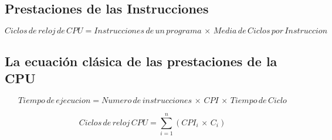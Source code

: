 \documentclass[12pt]{article}
\begin{document}
\subsection*{Prestaciones de las Instrucciones}

\begin{equation}
    Ciclos\hspace{2pt}de\hspace{2pt}reloj\hspace{2pt}de\hspace{2pt}CPU = Instrucciones\hspace{2pt}de\hspace{2pt}un\hspace{2pt}programa\hspace{2pt}\times\hspace{2pt}Media\hspace{2pt}de\hspace{2pt}Ciclos\hspace{2pt}por\hspace{2pt}Instruccion
\end{equation}

\subsection*{La ecuación clásica de las prestaciones de la CPU}

\begin{equation}
    Tiempo\hspace{2pt}de\hspace{2pt}ejecucion = Numero\hspace{2pt}de\hspace{2pt}instrucciones\hspace{2pt}\times\hspace{2pt}CPI\hspace{2pt}\times\hspace{2pt}Tiempo\hspace{2pt}de\hspace{2pt}Ciclo
\end{equation}

\begin{equation}
    Ciclos\hspace{2pt}de\hspace{2pt}reloj\hspace{2pt}CPU = \sum_{i=1}^{n}(CPI_i\hspace{2pt}\times\hspace{2pt}C_i)
\end{equation}
\end{document}
